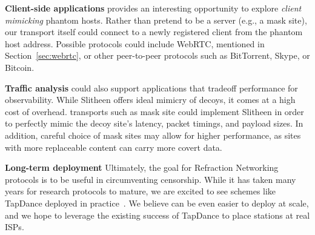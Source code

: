 \documentclass[sigconf]{acmart}
\renewcommand{\paragraph}[1]{\smallskip\noindent\textbf{#1\quad}}
\begin{document}
\paragraph{Client-side applications}
\scheme provides an interesting opportunity to explore
\emph{client mimicking} phantom hosts. Rather than pretend to be a server (e.g.,
a mask site), our transport itself could connect to a newly registered client
from the phantom host address. Possible protocols could include WebRTC, mentioned in
Section~\ref{sec:webrtc}, or other peer-to-peer protocols such as BitTorrent,
Skype, or Bitcoin.

\paragraph{Traffic analysis}
\scheme could also support applications that tradeoff performance for
observability. While Slitheen offers ideal mimicry of decoys, it comes at a high
cost of overhead. \scheme transports such as mask site could implement Slitheen
in order to perfectly mimic the decoy site's latency, packet timings, and payload
sizes. In addition, careful choice of mask sites may allow for higher
performance, as sites with more replaceable content can carry more covert data.

\paragraph{Long-term deployment}
Ultimately, the goal for Refraction Networking protocols is to be useful in
circumventing censorship. While it has taken many years for research
protocols to mature, we are excited to see schemes like TapDance deployed in
practice~\cite{frolov2017isp}. We believe \scheme can be even easier to deploy
at scale, and we hope to leverage the existing success of TapDance to place \scheme
stations at real ISPs.


%

\end{document}
